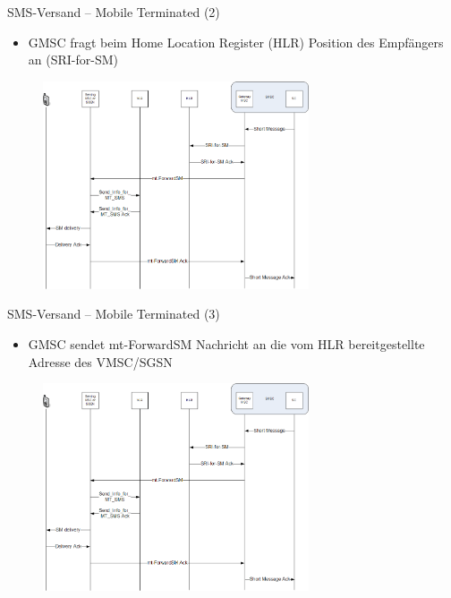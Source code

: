 \documentclass{beamer}
\begin{document}
\begin{frame}{SMS-Versand -- Mobile Terminated (2)}

	\begin{itemize}
		\item GMSC fragt beim Home Location Register (HLR) Position des 
			Empfängers an (SRI-for-SM)
	\end{itemize}
	\begin{figure}[htm]
		\includegraphics[width=0.7\textwidth]{img/mt-forward-sm-2.png}
	\end{figure}
\end{frame}

\begin{frame}{SMS-Versand -- Mobile Terminated (3)}

	\begin{itemize}
		\item GMSC sendet mt-ForwardSM Nachricht an die vom HLR bereitgestellte 
			Adresse des VMSC/SGSN
	\end{itemize}
	\begin{figure}[htm]
		\includegraphics[width=0.7\textwidth]{img/mt-forward-sm-3.png}
	\end{figure}
\end{frame}
\end{document}
